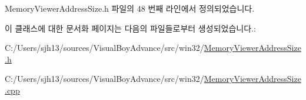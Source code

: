 Memory\+Viewer\+Address\+Size.\+h 파일의 48 번째 라인에서 정의되었습니다.



이 클래스에 대한 문서화 페이지는 다음의 파일들로부터 생성되었습니다.\+:\begin{DoxyCompactItemize}
\item 
C\+:/\+Users/sjh13/sources/\+Visual\+Boy\+Advance/src/win32/\mbox{\hyperlink{_memory_viewer_address_size_8h}{Memory\+Viewer\+Address\+Size.\+h}}\item 
C\+:/\+Users/sjh13/sources/\+Visual\+Boy\+Advance/src/win32/\mbox{\hyperlink{_memory_viewer_address_size_8cpp}{Memory\+Viewer\+Address\+Size.\+cpp}}\end{DoxyCompactItemize}

